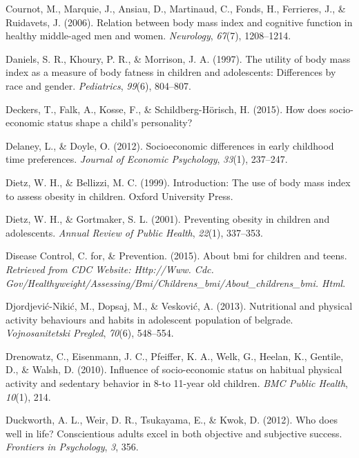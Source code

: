 \documentclass[man]{apa6}
\begin{document}
\leavevmode\hypertarget{ref-cournot2006relation}{}%
Cournot, M., Marquie, J., Ansiau, D., Martinaud, C., Fonds, H., Ferrieres, J., \& Ruidavets, J. (2006). Relation between body mass index and cognitive function in healthy middle-aged men and women. \emph{Neurology}, \emph{67}(7), 1208--1214.

\leavevmode\hypertarget{ref-daniels1997utility}{}%
Daniels, S. R., Khoury, P. R., \& Morrison, J. A. (1997). The utility of body mass index as a measure of body fatness in children and adolescents: Differences by race and gender. \emph{Pediatrics}, \emph{99}(6), 804--807.

\leavevmode\hypertarget{ref-deckers2015does}{}%
Deckers, T., Falk, A., Kosse, F., \& Schildberg-Hörisch, H. (2015). How does socio-economic status shape a child's personality?

\leavevmode\hypertarget{ref-delaney2012socioeconomic}{}%
Delaney, L., \& Doyle, O. (2012). Socioeconomic differences in early childhood time preferences. \emph{Journal of Economic Psychology}, \emph{33}(1), 237--247.

\leavevmode\hypertarget{ref-dietz1999introduction}{}%
Dietz, W. H., \& Bellizzi, M. C. (1999). Introduction: The use of body mass index to assess obesity in children. Oxford University Press.

\leavevmode\hypertarget{ref-dietz2001preventing}{}%
Dietz, W. H., \& Gortmaker, S. L. (2001). Preventing obesity in children and adolescents. \emph{Annual Review of Public Health}, \emph{22}(1), 337--353.

\leavevmode\hypertarget{ref-centers2015bmi}{}%
Disease Control, C. for, \& Prevention. (2015). About bmi for children and teens. \emph{Retrieved from CDC Website: Http://Www. Cdc. Gov/Healthyweight/Assessing/Bmi/Childrens\_bmi/About\_childrens\_bmi. Html}.

\leavevmode\hypertarget{ref-djordjevic2013nutritional}{}%
Djordjević-Nikić, M., Dopsaj, M., \& Vesković, A. (2013). Nutritional and physical activity behaviours and habits in adolescent population of belgrade. \emph{Vojnosanitetski Pregled}, \emph{70}(6), 548--554.

\leavevmode\hypertarget{ref-drenowatz2010influence}{}%
Drenowatz, C., Eisenmann, J. C., Pfeiffer, K. A., Welk, G., Heelan, K., Gentile, D., \& Walsh, D. (2010). Influence of socio-economic status on habitual physical activity and sedentary behavior in 8-to 11-year old children. \emph{BMC Public Health}, \emph{10}(1), 214.

\leavevmode\hypertarget{ref-duckworth2012does}{}%
Duckworth, A. L., Weir, D. R., Tsukayama, E., \& Kwok, D. (2012). Who does well in life? Conscientious adults excel in both objective and subjective success. \emph{Frontiers in Psychology}, \emph{3}, 356.
\end{document}
